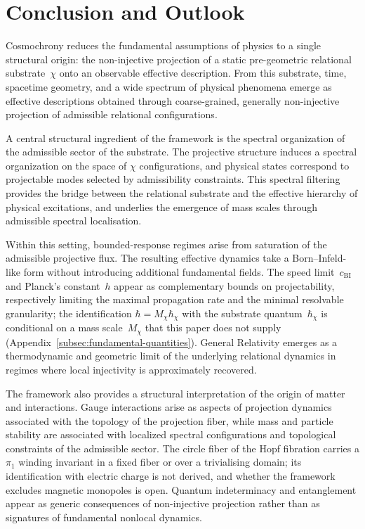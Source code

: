 \clearpage

\section{Conclusion and Outlook}
  \label{sec:conclusion-and-outlook}

  Cosmochrony reduces the fundamental assumptions of physics to a single
  structural origin: the non-injective projection of a static pre-geometric
  relational substrate~$\chi$ onto an observable effective description.
  From this substrate, time, spacetime geometry, and a wide spectrum of
  physical phenomena emerge as effective descriptions obtained through
  coarse-grained, generally non-injective projection of admissible relational configurations.

  A central structural ingredient of the framework is the spectral
  organization of the admissible sector of the substrate.
  The projective structure induces a spectral organization on the space of
  $\chi$ configurations, and physical states correspond to projectable
  modes selected by admissibility constraints.
  This spectral filtering provides the bridge between the relational
  substrate and the effective hierarchy of physical excitations,
  and underlies the emergence of mass scales through admissible spectral localisation.

  Within this setting, bounded-response regimes arise from saturation of
  the admissible projective flux.
  The resulting effective dynamics take a Born--Infeld-like form without
  introducing additional fundamental fields.
  The speed limit~$c_{\mathrm{BI}}$ and Planck's constant~$h$ appear as
  complementary bounds on projectability, respectively limiting the maximal
  propagation rate and the minimal resolvable granularity; the identification $\hbar = M_\chi\hbar_\chi$ with the
  substrate quantum~$\hbar_\chi$ is conditional on a mass scale~$M_\chi$ that this paper does not supply
  (Appendix~\ref{subsec:fundamental-quantities}).
  General Relativity emerges as a thermodynamic and geometric limit of the underlying
  relational dynamics in regimes where local injectivity is approximately recovered.

  The framework also provides a structural interpretation of the origin of
  matter and interactions.
  Gauge interactions arise as aspects of projection dynamics associated with
  the topology of the projection fiber, while mass and particle stability are
  associated with localized spectral configurations and topological constraints
  of the admissible sector.
  The circle fiber of the Hopf fibration carries a $\pi_1$ winding invariant in
  a fixed fiber or over a trivialising domain; its identification with electric
  charge is not derived, and whether the framework excludes magnetic monopoles is
  open.
  Quantum indeterminacy and entanglement appear as generic consequences of
  non-injective projection rather than as signatures of fundamental
  nonlocal dynamics.

